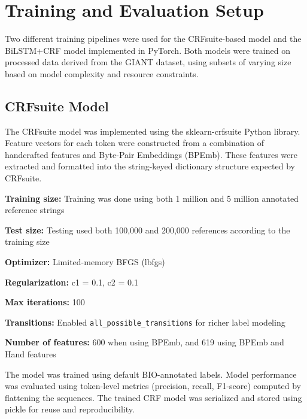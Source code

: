 \section{Training and Evaluation Setup}
Two different training pipelines were used for the CRFsuite-based model and the BiLSTM+CRF model implemented in PyTorch. Both models were trained on processed data derived from the GIANT dataset, using subsets of varying size based on model complexity and resource constraints.
\subsection{CRFsuite Model}
The CRFsuite model was implemented using the sklearn-crfsuite Python library. Feature vectors for each token were constructed from a combination of handcrafted features and Byte-Pair Embeddings (BPEmb). These features were extracted and formatted into the string-keyed dictionary structure expected by CRFsuite.
\begin{compactitem}
\item \textbf{Training size:} Training was done using both 1 million and 5 million annotated reference strings
\item \textbf{Test size:} Testing used both 100,000 and 200,000 references according to the training size
\item \textbf{Optimizer:} Limited-memory BFGS (lbfgs)
\item \textbf{Regularization:} c1 = 0.1, c2 = 0.1
\item \textbf{Max iterations:} 100
\item \textbf{Transitions:} Enabled \texttt{all\_possible\_transitions} for richer label modeling
\item \textbf{Number of features:} 600 when using BPEmb, and 619 using BPEmb and Hand features
\end{compactitem}
The model was trained using default BIO-annotated labels. Model performance was evaluated using token-level metrics (precision, recall, F1-score) computed by flattening the sequences. The trained CRF model was serialized and stored using pickle for reuse and reproducibility.

